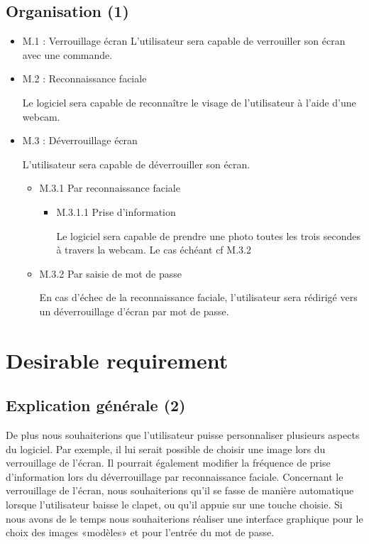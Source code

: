   \subsection{Organisation (1)}
  \begin{itemize}
    \item{M.1 : Verrouillage écran}
    L’utilisateur sera capable de verrouiller son écran avec une commande.
    \\
    \item{M.2 : Reconnaissance faciale}

    Le logiciel sera capable de reconnaître le visage de l’utilisateur à
    l’aide d’une webcam.
    \\
    \item{M.3 : Déverrouillage écran}

    L’utilisateur sera capable de déverrouiller son écran.
    \begin{itemize}
      \item{M.3.1 Par reconnaissance faciale}
      \begin{itemize}
        \item{M.3.1.1 Prise d’information}

        Le logiciel sera capable de prendre une photo toutes les trois
        secondes à travers la webcam.
		    Le cas échéant cf M.3.2
        \end{itemize}
        \vspace{0.5cm}
      \item{M.3.2 Par saisie de mot de passe}

      En cas d’échec de la reconnaissance faciale, l'utilisateur sera rédirigé
      vers un déverrouillage d'écran par mot de passe.
      \end{itemize}
  \end{itemize}

\section{Desirable requirement}
  \subsection{Explication générale (2)}
  De plus nous souhaiterions que l’utilisateur puisse personnaliser plusieurs
  aspects du logiciel. Par exemple, il lui serait possible de choisir une image
  lors du verrouillage de l’écran. Il pourrait également modifier la fréquence
  de prise d’information lors du déverrouillage par reconnaissance faciale.
  Concernant le verrouillage de l’écran, nous souhaiterions qu’il se fasse de
  manière automatique lorsque l’utilisateur baisse le clapet, ou qu’il appuie
  sur une touche choisie.
  Si nous avons de le temps nous souhaiterions réaliser une interface graphique
  pour le choix des images «modèles» et pour l’entrée du mot de passe.


